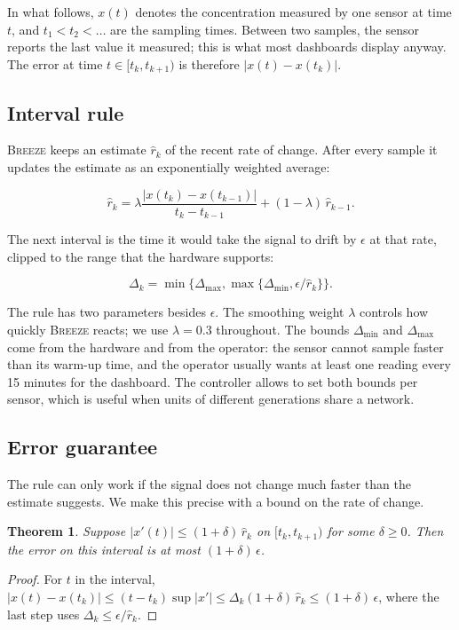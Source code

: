 \documentclass{article}
\newtheorem{thm}{Theorem}
\newcommand{\sys}{\textsc{Breeze}\xspace}
\begin{document}
In what follows, $x(t)$ denotes the concentration measured by one sensor at
time $t$, and $t_1 < t_2 < \dots$ are the sampling times. Between two
samples, the sensor reports the last value it measured; this is what most
dashboards display anyway. The error at time $t \in [t_k, t_{k+1})$ is
therefore $|x(t) - x(t_k)|$.

\subsection{Interval rule}

\sys keeps an estimate $\hat{r}_k$ of the recent rate of change. After every
sample it updates the estimate as an exponentially weighted average:

\begin{equation}
  \hat{r}_k = \lambda \frac{|x(t_k) - x(t_{k-1})|}{t_k - t_{k-1}} + (1 - \lambda)\, \hat{r}_{k-1}.
  \label{eq:rate}
\end{equation}

The next interval is the time it would take the signal to drift by
$\epsilon$ at that rate, clipped to the range that the hardware supports:

\begin{equation}
  \Delta_k = \min\bigl\{\Delta_{\max}, \max\{\Delta_{\min}, \epsilon / \hat{r}_k\}\bigr\}.
  \label{eq:interval}
\end{equation}

The rule has two parameters besides $\epsilon$. The smoothing weight
$\lambda$ controls how quickly \sys reacts; we use $\lambda = 0.3$
throughout. The bounds $\Delta_{\min}$ and $\Delta_{\max}$ come from the
hardware and from the operator: the sensor cannot sample faster than its
warm-up time, and the operator usually wants at least one reading every 15
minutes for the dashboard. The controller allows to set both bounds per
sensor, which is useful when units of different generations share a network.

\subsection{Error guarantee}

The rule can only work if the signal does not change much faster than the
estimate suggests. We make this precise with a bound on the rate of change.

\begin{thm}\label{thm:error}
  Suppose $|x'(t)| \le (1 + \delta)\, \hat{r}_k$ on $[t_k, t_{k+1})$ for some $\delta \ge 0$.
  Then the error on this interval is at most $(1 + \delta)\, \epsilon$.
\end{thm}
\begin{proof}
  For $t$ in the interval, $|x(t) - x(t_k)| \le (t - t_k) \sup |x'| \le \Delta_k (1 + \delta)\, \hat{r}_k
  \le (1 + \delta)\, \epsilon$, where the last step uses $\Delta_k \le \epsilon / \hat{r}_k$.
\end{proof}
\end{document}
